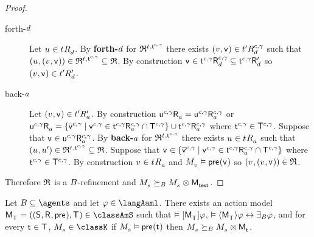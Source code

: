 \begin{proof}
\begin{description}
\begin{description}
            \item[forth-$\agentD$]
                Let $\kStateU \in \kSuccessorsD{\kStateT}$.
                By {\bf forth-$\agentD$} for $\refinement^{\kStateT, \aStateT[\agentC, \gamma]}$ there exists $(\kStateV, \aStateV) \in \kSuccessorsD[\agentC, \gamma]{\kStateTP}$ such that $(\kStateU, (\kStateV, \aStateV)) \in \refinement^{\kStateT, \aStateT[\agentC, \gamma]} \subseteq \refinement$.
                By construction $\aStateV \in \aSuccessorsD[\agentC, \gamma]{\aStateT[\agentC, \gamma]} \subseteq \aSuccessorsPD{\aStateT[\agentC, \gamma]}$ so $(\kStateV, \aStateV) \in \kSuccessorsPD{\kStateTP}$.
            \item[back-$\agentA$]
                Let $(\kStateV, \aStateV) \in \kSuccessorsPA{\kStateTP}$.
                By construction
                $\aSuccessorsA{\aStateU[\agentC, \gamma]} = \aSuccessorsA[\agentC, \gamma]{\aStateU[\agentC, \gamma]}$ or 
                $\aSuccessorsA{\aStateU[\agentC, \gamma]} = \{\aPStateV[\agentC, \gamma] \mid \aStateV[\agentC, \gamma] \in \aSuccessorsA[\agentC, \gamma]{\aStateT[\agentC, \gamma]} \cap \aStatesT[\agentC, \gamma]\} \cup \aSuccessorsA[\agentC, \gamma]{\aStateT[\agentC, \gamma]}$ where $\aStateT[\agentC, \gamma] \in \aStatesT[\agentC, \gamma]$.
                Suppose that $\aStateV \in \aSuccessorsA[\agentC, \gamma]{\aStateU[\agentC, \gamma]}$.
                By {\bf back-$\agentA$} for $\refinement^{\kStateT, \aStateT[\agentC, \gamma]}$ there exists $\kStateU \in \kSuccessorsA{\kStateT}$ such that $(\kStateU, \kStateUP) \in \refinement^{\kStateT, \aStateT[\agentC, \gamma]} \subseteq \refinement$.
                Suppose that $\aStateV \in \{\aPStateV[\agentC, \gamma] \mid \aStateV[\agentC, \gamma] \in \aSuccessorsA[\agentC, \gamma]{\aStateT[\agentC, \gamma]} \cap \aStatesT[\agentC, \gamma]\}$ where $\aStateT[\agentC, \gamma] \in \aStatesT[\agentC, \gamma]$.
                By construction $\kStateV \in \kSuccessorsA{\kStateT}$ and $\kPModel{\kStateV} \entails \aPrecondition(\aStateV)$ so $(\kStateV, (\kStateV, \aStateV)) \in \refinement$.
        \end{description}
\end{description}

Therefore $\refinement$ is a $\agentsB$-refinement and $\kPModel{\kStateS} \simulatesBs \kPModel{\kStateS} \exec \aPModel{\aStateTest}$.
\end{proof}

\begin{theorem}\label{aaml-s5-synthesis}
Let $\agentsB \subseteq \agents$ and let $\phi \in \langAaml$.
There exists an action model $\aPModelAndTuple{\aStatesT} \in \classAmS$ such that 
$\entails \actionA{\aPModel{\aStatesT}} \phi$,
$\entails \actionE{\aPModel{\aStatesT}} \phi \iff \someactsBs \phi$, and
for every $\aStateT \in \aStatesT$, $\kPModel{\kStateS} \in \classK$ if $\kPModel{\kStateS} \entails \aPrecondition(\aStateT)$ then $\kPModel{\kStateS} \simulatesBs \kPModel{\kStateS} \exec \aPModel{\aStateT}$.
\end{theorem}

